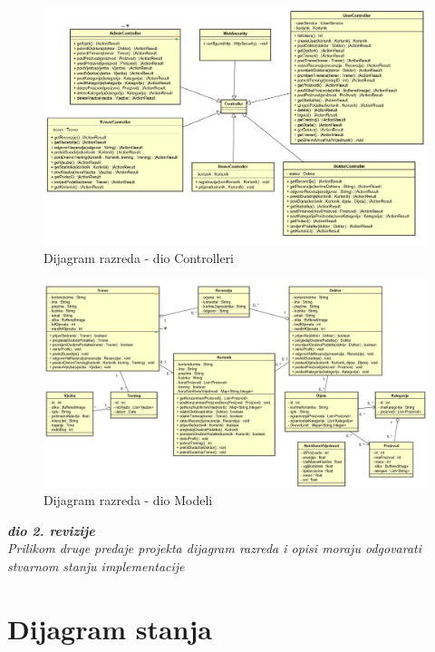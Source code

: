 			\begin{figure}[H]
			\includegraphics[scale=0.65]{slike/Controlleri.PNG}
			\centering
			\caption{Dijagram razreda - dio Controlleri}
			\label{fig:promjene}
			\end{figure}

			\begin{figure}[H]
			\includegraphics[scale=0.6]{slike/Modeli.PNG}
			\centering
			\caption{Dijagram razreda - dio Modeli}
			\label{fig:promjene}
			\end{figure}
			
			\textbf{\textit{dio 2. revizije}}\\			
			
			\textit{Prilikom druge predaje projekta dijagram razreda i opisi moraju odgovarati stvarnom stanju implementacije}
			
			
			
			\eject
		
		\section{Dijagram stanja}
			
